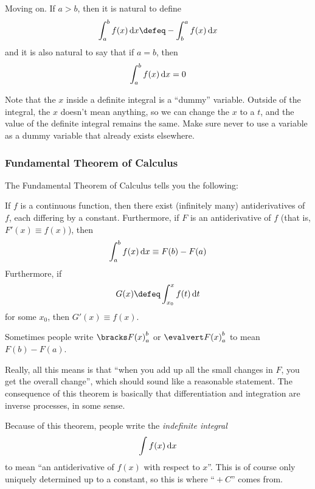 Moving on. If \(a > b\), then it is natural to define
\begin{equation*}
 \integ[a]<b>{f(x)}{x} \defeq -\integ[b]<a>{f(x)}{x}
\end{equation*}
and it is also natural to say that if \(a = b\), then
\begin{equation*}
 \integ[a]<b>{f(x)}{x} = 0
\end{equation*}

Note that the \(x\) inside a definite integral is a ``dummy'' variable. Outside
of the integral, the \(x\) doesn't mean anything, so we can change the \(x\) to
a \(t\), and the value of the definite integral remains the same. Make sure
never to use a variable as a dummy variable that already exists elsewhere.

\subsubsection{Fundamental Theorem of Calculus}

The Fundamental Theorem of Calculus tells you the following:
\begin{tcolorbox}
 If \(f\) is a continuous function, then there exist (infinitely many)
 antiderivatives of \(f\), each differing by a constant. Furthermore, if \(F\)
 is an antiderivative of \(f\) (that is, \(F'(x) \equiv f(x)\)), then
 \begin{equation*}
  \integ[a]<b>{f(x)}{x} \equiv F(b) - F(a)
 \end{equation*}
 Furthermore, if
 \begin{equation*}
  G(x) \defeq \integ[x_0]<x>{f(t)}{t}
 \end{equation*}
 for some \(x_0\), then \(G'(x) \equiv f(x)\).
\end{tcolorbox}
Sometimes people write \(\eval{a}{b}{F(x)}\) or \(\evalline{a}{b}{F(x)}\) to
mean \(F(b) - F(a)\).

Really, all this means is that ``when you add up all the small changes in
\(F\), you get the overall change'', which should sound like a reasonable
statement. The consequence of this theorem is basically that differentiation and
integration are inverse processes, in some sense.

Because of this theorem, people write the \emph{indefinite integral}
\begin{equation*}
 \integ{f(x)}{x}
\end{equation*}
to mean ``an antiderivative of \(f(x)\) with respect to \(x\)''. This is of
course only uniquely determined up to a constant, so this is where ``\({}+ C\)''
comes from.

